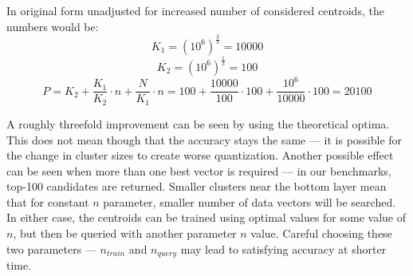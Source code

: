 In original form unadjusted for increased number of considered centroids,
the numbers would be:
$$ K_1 = (10^6)^{\frac{2}{3}} = 10000 $$
$$ K_2 = (10^6)^{\frac{1}{3}} = 100 $$
$$ 
P = K_2 + \frac{K_1}{K_2} \cdot n + \frac{N}{K_1} \cdot n =
100 + \frac{10000}{100} \cdot 100 + \frac{10^6}{10000} \cdot 100 =
20100
$$

A roughly threefold improvement can be seen by using the theoretical optima.
This does not mean though that the accuracy stays the same --- it is possible
for the change in cluster sizes to create worse quantization. Another
possible effect can be seen when more than one best vector is required ---
in our benchmarks, top-100 candidates are returned. Smaller clusters near
the bottom layer mean that for constant $n$ parameter, smaller number of
data vectors will be searched.
In either case, the centroids can
be trained using optimal values for some value of $n$, but then be queried
with another parameter $n$ value. Careful choosing these two parameters ---
$n_{train}$ and $n_{query}$ may lead to satisfying accuracy at shorter time.
